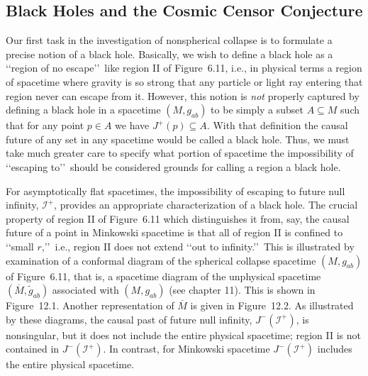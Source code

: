 
\subsection{Black Holes and the Cosmic Censor Conjecture}\label{sec:12.1}
\setcounter{theorem}{0}

Our first task in the investigation of nonspherical collapse is to formulate a precise
notion of a black hole. Basically, we wish to define a black hole as a \lq\lq region of
no escape\rq\rq\ like region II of Figure~6.11, i.e., in physical terms a region of
spacetime where gravity is so strong that any particle or light ray entering that
region never can escape from it. However, this notion is \emph{not} properly captured
by defining a black hole in a spacetime \((M,g_{ab})\) to be simply a subset
\(A\subseteq M\) such that for any point \(p\in A\) we have \(J^+(p)\subseteq A\).
With that definition the causal future of any set in any spacetime would be called a
black hole. Thus, we must take much greater care to specify what portion of
spacetime the impossibility of \lq\lq escaping to\rq\rq\ should be considered grounds
for calling a region a black hole.

For asymptotically flat spacetimes, the impossibility of escaping to future null
infinity, \(\mathcal I^+\), provides an appropriate characterization of a black hole.
The crucial property of region II of Figure~6.11 which distinguishes it from, say,
the causal future of a point in Minkowski spacetime is that all of region II is confined
to \lq\lq small \(r\),\rq\rq\ i.e., region II does not extend \lq\lq out to infinity.\rq\rq\ This
is illustrated by examination of a conformal diagram of the spherical collapse
spacetime \((M,g_{ab})\) of Figure~6.11, that is, a spacetime diagram of the
unphysical spacetime \((\overline M,\widetilde g_{ab})\) associated with
\((M,g_{ab})\) (see chapter 11). This is shown in Figure~12.1. Another
representation of \(\overline M\) is given in Figure~12.2. As illustrated by these
diagrams, the causal past of future null infinity, \(J^-(\mathcal I^+)\), is
nonsingular, but it does not include the entire physical spacetime; region II is not
contained in \(J^-(\mathcal I^+)\). In contrast, for Minkowski spacetime
\(J^-(\mathcal I^+)\) includes the entire physical spacetime.

